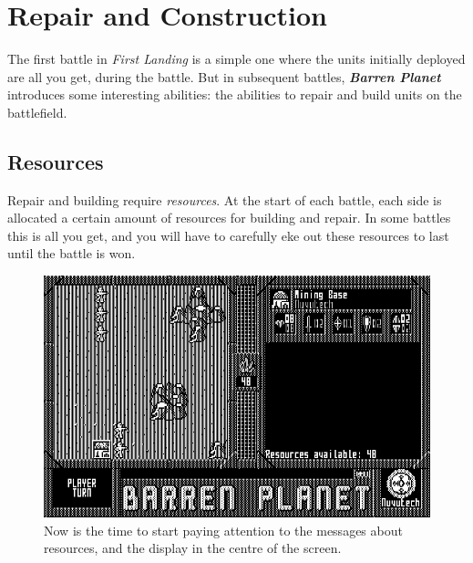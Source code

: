 %
%
%
%

\chapter{Repair and Construction}

\noindent
The first battle in {\it First Landing} is a simple one where the units initially deployed are all you get, during the battle. But in subsequent battles, {\bf \it Barren Planet} introduces some interesting abilities: the abilities to repair and build units on the battlefield.

\section{Resources}

\noindent
Repair and building require {\it resources}. At the start of each battle, each side is allocated a certain amount of resources for building and repair. In some battles this is all you get, and you will have to carefully eke out these resources to last until the battle is won.

\begin{figure}[h]
  \includegraphics[width=\textwidth]{starting-resources}
  \caption{Now is the time to start paying attention to the messages
    about resources, and the display in the centre of the screen.}
\end{figure}

